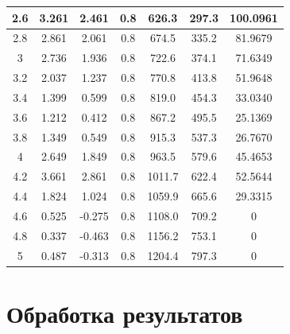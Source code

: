 \documentclass[a4paper]{article}
\begin{document}
\begin{enumerate}
\begin{table}[H]
\begin{tabular}{|c|c|c|c|c|c|c|}
            2.6 & 3.261 & 2.461 & 0.8 & 626.3 & 297.3 & 100.0961 \\ \hline
            2.8 & 2.861 & 2.061 & 0.8 & 674.5 & 335.2 & 81.9679 \\ \hline
            3 & 2.736 & 1.936 & 0.8 & 722.6 & 374.1 & 71.6349 \\ \hline
            3.2 & 2.037 & 1.237 & 0.8 & 770.8 & 413.8 & 51.9648 \\ \hline
            3.4 & 1.399 & 0.599 & 0.8 & 819.0 & 454.3 & 33.0340 \\ \hline
            3.6 & 1.212 & 0.412 & 0.8 & 867.2 & 495.5 & 25.1369 \\\hline
            3.8 & 1.349 & 0.549 & 0.8 & 915.3 & 537.3 & 26.7670 \\\hline
            4 & 2.649 & 1.849 & 0.8 & 963.5 & 579.6 & 45.4653 \\\hline
            4.2 & 3.661 & 2.861 & 0.8 & 1011.7 & 622.4 & 52.5644 \\\hline
            4.4 & 1.824 & 1.024 & 0.8 & 1059.9 & 665.6 & 29.3315 \\\hline
            4.6 & 0.525 & -0.275 & 0.8 & 1108.0 & 709.2 & 0 \\\hline
            4.8 & 0.337 & -0.463 & 0.8 & 1156.2 & 753.1 & 0 \\\hline
            5 & 0.487 & -0.313 & 0.8 & 1204.4 & 797.3 & 0 \\\hline
        \end{tabular}
    \end{table}
\end{enumerate}


\section{Обработка результатов}
\end{document}
